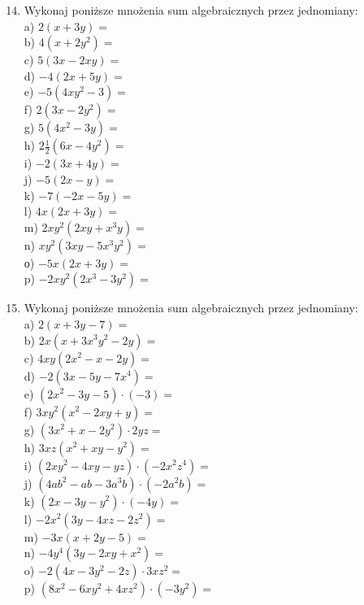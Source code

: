 \documentclass[10pt]{article}
\begin{document}
\begin{enumerate}
  \setcounter{enumi}{13}
  \item Wykonaj poniższe mnożenia sum algebraicznych przez jednomiany:\\
a) \(2(x+3 y)=\)\\
b) \(4\left(x+2 y^{2}\right)=\)\\
c) \(5(3 x-2 x y)=\)\\
d) \(-4(2 x+5 y)=\)\\
e) \(-5\left(4 x y^{2}-3\right)=\)\\
f) \(2\left(3 x-2 y^{2}\right)=\)\\
g) \(5\left(4 x^{2}-3 y\right)=\)\\
h) \(2 \frac{1}{2}\left(6 x-4 y^{2}\right)=\)\\
i) \(-2(3 x+4 y)=\)\\
j) \(-5(2 x-y)=\)\\
k) \(-7(-2 x-5 y)=\)\\
l) \(4 x(2 x+3 y)=\)\\
m) \(2 x y^{2}\left(2 x y+x^{3} y\right)=\)\\
n) \(x y^{2}\left(3 x y-5 x^{3} y^{2}\right)=\)\\
о) \(-5 x(2 x+3 y)=\)\\
p) \(-2 x y^{2}\left(2 x^{3}-3 y^{2}\right)=\)
  \item Wykonaj poniższe mnożenia sum algebraicznych przez jednomiany:\\
a) \(2(x+3 y-7)=\)\\
b) \(2 x\left(x+3 x^{3} y^{2}-2 y\right)=\)\\
c) \(4 x y\left(2 x^{2}-x-2 y\right)=\)\\
d) \(-2\left(3 x-5 y-7 x^{4}\right)=\)\\
e) \(\left(2 x^{2}-3 y-5\right) \cdot(-3)=\)\\
f) \(3 x y^{2}\left(x^{2}-2 x y+y\right)=\)\\
g) \(\left(3 x^{2}+x-2 y^{2}\right) \cdot 2 y z=\)\\
h) \(3 x z\left(x^{2}+x y-y^{2}\right)=\)\\
i) \(\left(2 x y^{2}-4 x y-y z\right) \cdot\left(-2 x^{2} z^{4}\right)=\)\\
j) \(\left(4 a b^{2}-a b-3 a^{3} b\right) \cdot\left(-2 a^{2} b\right)=\)\\
k) \(\left(2 x-3 y-y^{2}\right) \cdot(-4 y)=\)\\
l) \(-2 x^{2}\left(3 y-4 x z-2 z^{2}\right)=\)\\
m) \(-3 x(x+2 y-5)=\)\\
n) \(-4 y^{4}\left(3 y-2 x y+x^{2}\right)=\)\\
o) \(-2\left(4 x-3 y^{2}-2 z\right) \cdot 3 x z^{2}=\)\\
p) \(\left(8 x^{2}-6 x y^{2}+4 x z^{2}\right) \cdot\left(-3 y^{2}\right)=\)
\end{enumerate}
\end{document}
